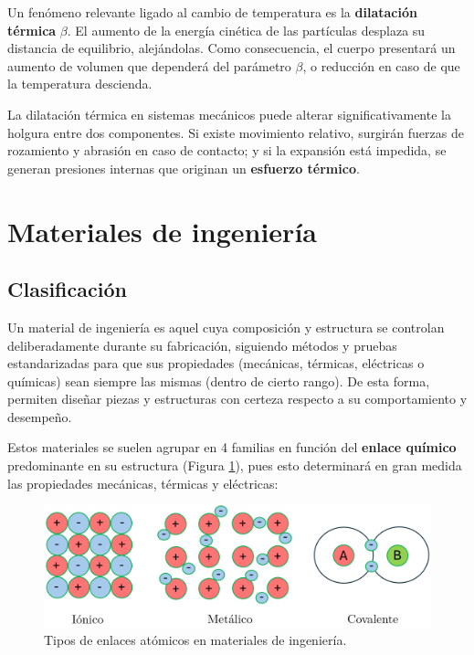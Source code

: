 Un fenómeno relevante ligado al cambio de temperatura es la \textbf{dilatación térmica} $\beta$. El aumento de la energía cinética de las partículas desplaza su distancia de equilibrio, alejándolas. Como consecuencia, el cuerpo presentará un aumento de volumen que dependerá del parámetro $\beta$, o reducción en caso de que la temperatura descienda.

La dilatación térmica en sistemas mecánicos puede alterar significativamente la holgura entre dos componentes. Si existe movimiento relativo, surgirán fuerzas de rozamiento y abrasión en caso de contacto; y si la expansión está impedida, se generan presiones internas que originan un \textbf{esfuerzo térmico}.

\section{Materiales de ingeniería}

\subsection{Clasificación}

Un material de ingeniería es aquel cuya composición y estructura se controlan deliberadamente durante su fabricación, siguiendo métodos y pruebas estandarizadas para que sus propiedades (mecánicas, térmicas, eléctricas o químicas) sean siempre las mismas (dentro de cierto rango). De esta forma, permiten diseñar piezas y estructuras con certeza respecto a su comportamiento y desempeño.

Estos materiales se suelen agrupar en 4 familias en función del \textbf{enlace químico} predominante en su estructura (Figura \ref{bons}), pues esto determinará en gran medida las propiedades mecánicas, térmicas y eléctricas:

\begin{figure}[h!]
    \centering
    \includegraphics[width=1.0\linewidth]{imgs/bonds.png}
    \caption{Tipos de enlaces atómicos en materiales de ingeniería.} 
    \label{bons}
\end{figure}

